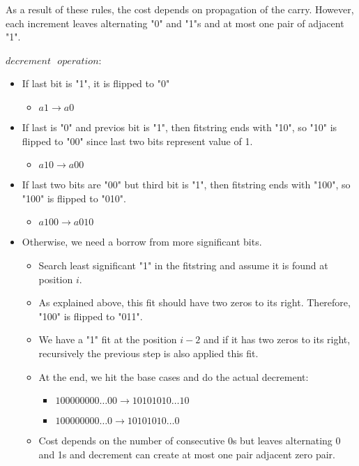 As a result of these rules, the cost depends on propagation of the carry. However, each increment leaves alternating "0" and "1"s and at most one pair of adjacent "1".

\clearpage

$decrement\text{ }operation$: \\
\vspace{-0.3cm}
\begin{itemize}
\item If last bit is "1", it is flipped to "0"
\begin{itemize}
\item $a1 \rightarrow a0$
\end{itemize}
\item If last is "0" and previos bit is "1", then fitstring ends with "10", so "10" is flipped to "00" since last two bits represent value of 1.
\begin{itemize}
\item $a10 \rightarrow a00$
\end{itemize}
\item If last two bits are "00" but third bit is "1", then fitstring ends with "100", so "100" is flipped to "010".
\begin{itemize}
\item $a100 \rightarrow a010$
\end{itemize}
\item Otherwise, we need a borrow from more significant bits.
\begin{itemize}
\item Search least significant "1" in the fitstring and assume it is found at position $i$.
\item As explained above, this fit should have two zeros to its right. Therefore, "100" is flipped to "011".
\item We have a "1" fit at the position $i-2$ and if it has two zeros to its right, recursively the previous step is also applied this fit.
\item At the end, we hit the base cases and do the actual decrement:
\begin{itemize}
\item $100000000\dots00 \rightarrow 10101010\dots10$
\item $100000000\dots0 \rightarrow 10101010\dots0$
\end{itemize}
\item Cost depends on the number of consecutive 0s but leaves alternating 0 and 1s and decrement can create at most one pair adjacent zero pair.
\end{itemize}
\end{itemize}

